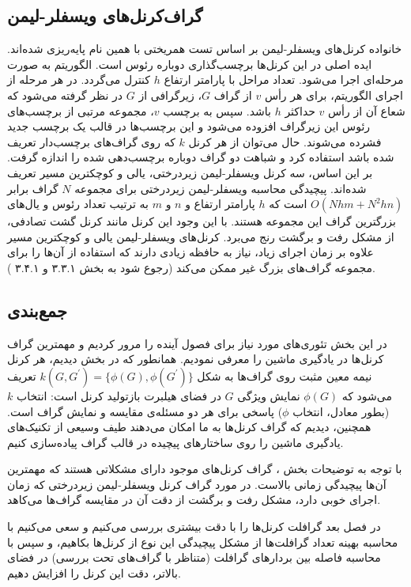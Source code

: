 \subsection{گراف‌کرنل‌های ویسفلر-لیمن}
 خانواده کرنل‌های ویسفلر-لیمن بر اساس تست همریختی با همین نام پایه‌ریزی شده‌اند. ایده اصلی در این کرنل‌ها برچسب‌گذاری دوباره رئوس است. الگوریتم به صورت مرحله‌ای اجرا می‌شود. تعداد مراحل با پارامتر ارتفاع $h$ کنترل می‌گردد. در هر مرحله از اجرای الگوریتم، برای هر رأس $v$ از گراف $G$، زیرگرافی از $G$ در نظر گرفته می‌شود که شعاع آن از رأس $v$ حداکثر $h$ باشد. سپس به برچسب $v$، مجموعه مرتبی از برچسب‌های رئوس این زیرگراف افزوده می‌شود و این برچسب‌ها در قالب یک برچسب جدید فشرده می‌شوند. حال می‌توان از هر کرنل $k$ که روی گراف‌های برچسب‌دار تعریف شده باشد استفاده کرد و شباهت دو گراف دوباره برچسب‌دهی شده را اندازه گرفت. بر این اساس، سه کرنل ویسفلر-لیمن زیردرختی، یالی و کوچکترین مسیر تعریف شده‌اند. پیچیدگی محاسبه ویسفلر-لیمن زیردرختی برای مجموعه $N$ گراف برابر  $O(Nhm+N^2hn)$ است که $h$ پارامتر ارتفاع و $n$ و $m$ به ترتیب تعداد رئوس و یال‌های بزرگترین گراف این مجموعه هستند. با این وجود این کرنل مانند کرنل گشت تصادفی، از مشکل رفت و برگشت رنج می‌برد. کرنل‌های ویسفلر-لیمن یالی و کوچکترین مسیر علاوه بر زمان اجرای زیاد، نیاز به حافظه زیادی دارند که استفاده از آن‌ها را برای مجموعه گراف‌های بزرگ غیر ممکن می‌کند (رجوع شود به بخش ۳.۳.۱ و ۳.۴.۱ ).
 
\subsection{جمع‌بندی}
در این بخش تئوری‌های مورد نیاز برای فصول آینده را مرور کردیم و مهمترین گراف کرنل‌ها در یادگیری ماشین را معرفی نمودیم. همانطور که در بخش‌  دیدیم، هر کرنل نیمه معین مثبت روی گراف‌ها به شکل $k(G,G^\prime) = \lbrace{\phi(G),\phi(G^\prime)}\rbrace$ تعریف می‌شود که $\phi(G)$ نمایش ویژگی $G$ در فضای هیلبرت بازتولید کرنل است: انتخاب $k$ (بطور معادل، انتخاب $\phi$) پاسخی برای هر دو مسئله‌ی مقایسه و نمایش گراف است. همچنین، دیدیم که گراف کرنل‌ها به ما امکان می‌دهند طیف وسیعی از تکنیک‌های یادگیری ماشین را روی ساختارهای پیچیده در قالب گراف پیاده‌سازی کنیم.

با توجه به توضیحات بخش ، گراف کرنل‌های موجود دارای مشکلاتی هستند که مهمترین آن‌ها پیچیدگی زمانی بالاست. در مورد گراف کرنل ویسفلر-لیمن زیردرختی که زمان اجرای خوبی دارد، مشکل رفت و برگشت از دقت آن در مقایسه گراف‌ها می‌کاهد.

در فصل بعد گرافلت کرنل‌ها را با دقت بیشتری بررسی می‌کنیم و سعی می‌کنیم با محاسبه بهینه تعداد گرافلت‌ها از مشکل پیچیدگی این نوع از کرنل‌ها بکاهیم، و سپس با محاسبه فاصله بین بردارهای گرافلت (متناظر با گراف‌های تحت بررسی) در فضای بالاتر، دقت این کرنل را افزایش دهیم.
